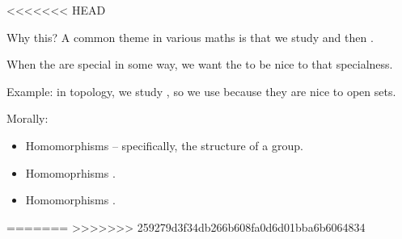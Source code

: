 \documentclass[8pt, handout]{beamer}
\begin{document}
<<<<<<< HEAD
\begin{frame}{Why this?}
  A common theme in various maths is that we study  and then .

  \medskip \pause

  When the  are special in some way, we want the  to be nice to that specialness.

  \medskip \pause

  Example: in topology, we study , so we use  because they are nice to open sets.

  \medskip \pause
  \begin{exampleblock}{Morally:} \pause
    \begin{itemize}
      \item Homomorphisms  -- specifically, the structure of a group. \pause
      \item Homomoprhisms . \pause
      \item Homomorphisms . \pause
    \end{itemize}
  \end{exampleblock}
\end{frame}

=======
>>>>>>> 259279d3f34db266b608fa0d6d01bba6b6064834
\end{document}
